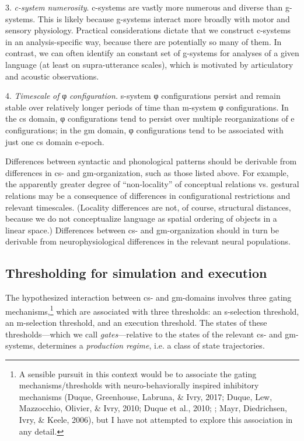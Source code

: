 3. \textit{c-system} \textit{numerosity}. c-systems are vastly more numerous and diverse than g-systems. This is likely because g-systems interact more broadly with motor and sensory physiology. Practical considerations dictate that we construct c-systems in an analysis-specific way, because there are potentially so many of them. In contrast, we can often identify an constant set of g-systems for analyses of a given language (at least on supra-utterance scales), which is motivated  by articulatory and acoustic observations.

4. \textit{Timescale} \textit{of} φ \textit{configuration.} s-system φ configurations persist and remain stable over relatively longer periods of time than m-system φ configurations. In the cs domain, φ configurations tend to persist over multiple reorganizations of e configurations; in the gm domain, φ configurations tend to be associated with just one cs domain e-epoch.

  Differences between syntactic and phonological patterns should be derivable from differences in cs- and gm-organization, such as those listed above. For example, the apparently greater degree of “non-locality” of conceptual relations vs. gestural relations may be a consequence of differences in configurational restrictions and relevant timescales. (Locality differences are not, of course, structural distances, because we do not conceptualize language as spatial ordering of objects in a linear space.) Differences between cs- and gm-organization should in turn be derivable from neurophysiological differences in the relevant neural populations.

\subsection{Thresholding for simulation and execution}

The hypothesized interaction between cs- and gm-domains involves three gating mechanisms,\footnote{A sensible pursuit in this context would be to associate the gating mechanisms/thresholds with neuro-behaviorally inspired inhibitory mechanisms (Duque, Greenhouse, Labruna, \& Ivry, 2017; Duque, Lew, Mazzocchio, Olivier, \& Ivry, 2010; Duque et al., 2010; \citealt{DuqueIvry2009}; Mayr, Diedrichsen, Ivry, \& Keele, 2006), but I have not attempted to explore this association in any detail.} which are associated with three thresholds: an s-selection threshold, an m-selection threshold, and an execution threshold. The states of these thresholds—which we call \textit{gates}—relative to the states of the relevant cs- and gm-systems, determines a \textit{production} \textit{regime}, i.e. a class of state trajectories. 

